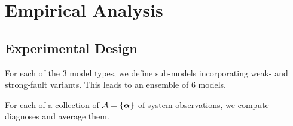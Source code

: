 \section{Empirical Analysis}

\subsection{Experimental Design}

For each of the 3 model types, we define sub-models incorporating weak- and strong-fault variants. This leads to an ensemble of 6 models.

For each of a collection of ${\cal A} = \{\vec{\alpha}\}$ of system observations, we compute diagnoses and average them.